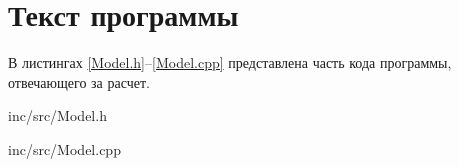 \chapter{Текст программы}
В листингах \ref{Model.h}--\ref{Model.cpp} представлена часть кода программы, отвечающего за расчет.


\begin{lstinputlisting}[
	caption={Header файл},
	label={Model.h},
	language={C++},
	]{inc/src/Model.h}
\end{lstinputlisting}

\newpage
\begin{lstinputlisting}[
	caption={Исходный код},
	label={Model.cpp},
	language={C++},
	]{inc/src/Model.cpp}
\end{lstinputlisting}